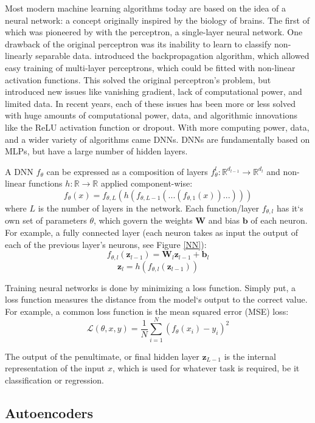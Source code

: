 \documentclass{article}
\begin{document}
Most modern machine learning algorithms today are based on the idea of a neural network: a concept originally inspired by the biology of brains. The first of which was pioneered by \citet{rosenblatt_perceptron_1958} with the perceptron, a single-layer neural network. One drawback of the original perceptron was its inability to learn to classify non-linearly separable data. \citet{rumelhart_learning_1986} introduced the backpropagation algorithm, which allowed easy training of multi-layer perceptrons, which could be fitted with non-linear activation functions. This solved the original perceptron's problem, but introduced new issues like vanishing gradient, lack of computational power, and limited data. In recent years, each of these issues has been more or less solved with huge amounts of computational power, data, and algorithmic innovations like the ReLU activation function or dropout. With more computing power, data, and a wider variety of algorithms came DNNs. DNNs are fundamentally based on MLPs, but have a large number of hidden layers.


A DNN \(f_\theta\) can be expressed as a composition of layers \(f_\theta^l:\mathbb{R}^{d_{l-1}}\rightarrow\mathbb{R}^{d_l}\) and non-linear functions \(h:\mathbb{R}\rightarrow\mathbb{R}\) applied component-wise:
\[f_\theta(x) = f_{\theta,L}(h(f_{\theta,L-1}(...(f_{\theta,1}(x))...)))\] 
where \(L\) is the number of layers in the network. Each function/layer \(f_{\theta,l}\) has it`s own set of parameters \(\theta\), which govern the weights \(\mathbf{W}\) and bias \(\mathbf{b}\) of each neuron. For example, a fully connected layer (each neuron takes as input the output of each of the previous layer's neurons, see Figure \ref{NN}):
\[f_{\theta,l}(\mathbf{z}_{l-1}) = \mathbf{W}_l\mathbf{z}_{l-1} + \mathbf{b}_l\]
\[\mathbf{z}_l = h(f_{\theta,l}(\mathbf{z}_{l-1}))\]

Training neural networks is done by minimizing a loss function. Simply put, a loss function measures the distance from the model`s output to the correct value. For example, a common loss function is the mean squared error (MSE) loss:
\[\mathcal{L}(\theta, x, y) = \frac{1}{N}\displaystyle\sum_{i=1}^{N}(f_\theta(x_i) - y_i)^2\] 

The output of the penultimate, or final hidden layer \(\mathbf{z}_{L-1}\) is the internal representation of the input \(x\), which is used for whatever task is required, be it classification or regression.



\subsection{Autoencoders}
\end{document}
